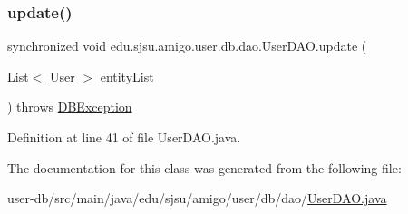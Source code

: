 \subsubsection{\texorpdfstring{update()}{update()}}
{\footnotesize\ttfamily synchronized void edu.\+sjsu.\+amigo.\+user.\+db.\+dao.\+User\+D\+A\+O.\+update (\begin{DoxyParamCaption}\item[{List$<$ \hyperlink{classedu_1_1sjsu_1_1amigo_1_1user_1_1db_1_1model_1_1_user}{User} $>$}]{entity\+List }\end{DoxyParamCaption}) throws \hyperlink{classedu_1_1sjsu_1_1amigo_1_1db_1_1common_1_1_d_b_exception}{D\+B\+Exception}}



Definition at line 41 of file User\+D\+A\+O.\+java.



The documentation for this class was generated from the following file\+:\begin{DoxyCompactItemize}
\item 
user-\/db/src/main/java/edu/sjsu/amigo/user/db/dao/\hyperlink{_user_d_a_o_8java}{User\+D\+A\+O.\+java}\end{DoxyCompactItemize}
